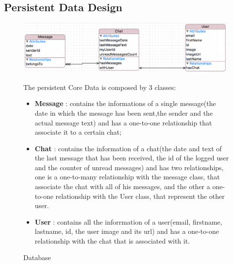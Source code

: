 \subsection{Persistent Data Design}
\begin{figure}[H]
\centering
\includegraphics[width=1\textwidth]{./images/Tinfinity_CoreData.png}
\caption{Database}


The persistent Core Data is composed by 3 classes:

\begin{itemize}
\item \textbf{Message} : contains the informations of a single message(the date in which the message has been sent,the sender and the actual message text) and has a one-to-one relationship that associate it to a certain chat;
\item \textbf{Chat} : contains the information of a chat(the date and text of the last message that has been received, the id of the logged user and the counter of unread messages) and has two relationships, one is a one-to-many relationship with the message class, that associate the chat with all of his messages, and the other a one-to-one relationship with the User class, that represent the other user.
\item \textbf{User} : contains all the inforrmation of a user(email, firstname, lastname, id, the user image and its url) and has a one-to-one relationship with the chat that is associated with it.
\end{itemize}
\end{figure}







